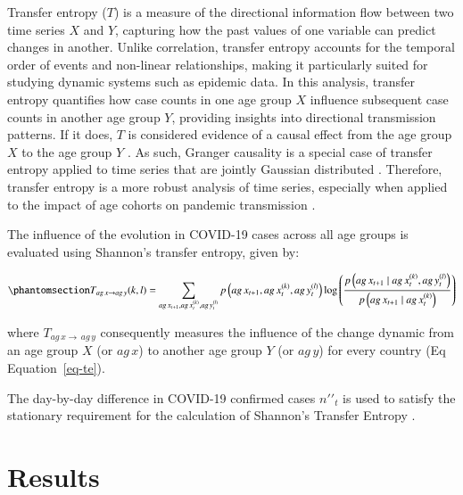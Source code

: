 \documentclass[
  number]{elsarticle}
\begin{document}
Transfer entropy (\(T\)) is a measure of the directional information
flow between two time series \(X\) and \(Y\), capturing how the past
values of one variable can predict changes in another. Unlike
correlation, transfer entropy accounts for the temporal order of events
and non-linear relationships, making it particularly suited for studying
dynamic systems such as epidemic data. In this analysis, transfer
entropy quantifies how case counts in one age group \(X\) influence
subsequent case counts in another age group \(Y\), providing insights
into directional transmission patterns. If it does, \(T\) is considered
evidence of a causal effect from the age group \(X\) to the age group
\(Y\) \citep{schreiber2000measuring}. As such, Granger causality is a
special case of transfer entropy applied to time series that are jointly
Gaussian distributed \citep{barnett2009granger}. Therefore, transfer
entropy is a more robust analysis of time series, especially when
applied to the impact of age cohorts on pandemic transmission
\citep{kissler2020symbolic}.

The influence of the evolution in COVID-19 cases across all age groups
is evaluated using Shannon's transfer entropy, given by:

\begin{equation}\phantomsection\label{eq-te}{
\begin{aligned}[t]
  T_{ag\,x \rightarrow ag\,y}(k,l) = \sum_{ag\,x_{t+1}, ag\,x_t^{(k)}, ag\,y_t^{(l)}} 
  p\left(ag\,x_{t+1}, ag\,x_t^{(k)}, ag\,y_t^{(l)}\right) 
  \log \left(\frac{p\left(ag\,x_{t+1} \mid ag\,x_t^{(k)}, ag\,y_t^{(l)}\right)}{p\left(ag\,x_{t+1} \mid ag\,x_t^{(k)}\right)}\right)
\end{aligned}
}\end{equation}

\noindent where \(T_{ag\,x \rightarrow\,ag\,y}\) consequently measures
the influence of the change dynamic from an age group \(X\) (or
\(ag\,x\)) to another age group \(Y\) (or \(ag\,y\)) for every country
(Eq Equation~\ref{eq-te}).

The day-by-day difference in COVID-19 confirmed cases
\(n\prime\prime_t\) is used to satisfy the stationary requirement for
the calculation of Shannon's Transfer Entropy
\citep{shannon1948mathematical, behrendt2019rtransferentropy}.

\section{Results}\label{results}
\end{document}
